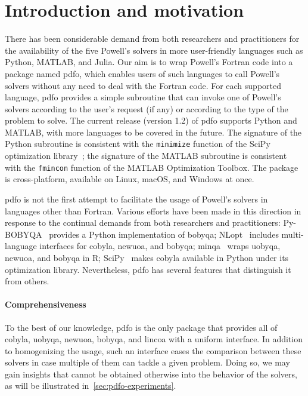 \section{Introduction and motivation}
\label{sec:pdfo-introduction}

There has been considerable demand from both researchers and practitioners for the availability of the five Powell's solvers in more user-friendly languages such as Python, MATLAB, and Julia.
Our aim is to wrap Powell's Fortran code into a package named \gls{pdfo}, which enables users of such languages to call Powell's solvers without any need to deal with the Fortran code.
For each supported language, \gls{pdfo} provides a simple subroutine that can invoke one of Powell's solvers according to the user's request (if any) or according to the type of the problem to solve.
The current release (version 1.2) of \gls{pdfo} supports Python and MATLAB, with more languages to be covered in the future.
The signature of the Python subroutine is consistent with the \texttt{minimize} function of the SciPy optimization library~\cite{Virtanen_Etal_2020};
the signature of the MATLAB subroutine is consistent with the \texttt{fmincon} function of the MATLAB Optimization Toolbox.
The package is cross-platform, available on Linux, macOS, and Windows at once.

\Gls{pdfo} is not the first attempt to facilitate the usage of Powell's solvers in languages other than Fortran.
Various efforts have been made in this direction in response to the continual demands from both researchers and practitioners: Py-BOBYQA~\cite{Cartis_Etal_2019} provides a Python implementation of \gls{bobyqa}; NLopt~\cite{Johnson_2019} includes multi-language interfaces for \gls{cobyla}, \gls{newuoa}, and \gls{bobyqa}; minqa~\cite{Bates_Etal_2014} wraps \gls{uobyqa}, \gls{newuoa}, and \gls{bobyqa} in R; SciPy~\cite{Virtanen_Etal_2020} makes \gls{cobyla} available in Python under its optimization library.
Nevertheless, \gls{pdfo} has several features that distinguish it from others.

\paragraph{Comprehensiveness}

To the best of our knowledge, \gls{pdfo} is the only package that provides all of \gls{cobyla}, \gls{uobyqa}, \gls{newuoa}, \gls{bobyqa}, and \gls{lincoa} with a uniform interface.
In addition to homogenizing the usage, such an interface eases the comparison between these solvers in case multiple of them can tackle a given problem.
Doing so, we may gain insights that cannot be obtained otherwise into the behavior of the solvers, as will be illustrated in~\cref{sec:pdfo-experiments}.

